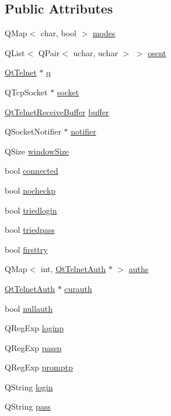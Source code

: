\subsection*{Public Attributes}
\begin{DoxyCompactItemize}
\item 
QMap$<$ char, bool $>$ \hyperlink{classQtTelnetPrivate_a19f4f4927ab411905a637e04694dd4b4}{modes}
\item 
QList$<$ QPair$<$ uchar, uchar $>$ $>$ \hyperlink{classQtTelnetPrivate_a8c36d306aa1d9e15183f339ec9bc5862}{osent}
\item 
\hyperlink{classQtTelnet}{QtTelnet} $\ast$ \hyperlink{classQtTelnetPrivate_accc5387fdb43bf070a18bcf975134406}{q}
\item 
QTcpSocket $\ast$ \hyperlink{classQtTelnetPrivate_a8a3800a6c6c14c4501ac0cb5d1f9996b}{socket}
\item 
\hyperlink{classQtTelnetReceiveBuffer}{QtTelnetReceiveBuffer} \hyperlink{classQtTelnetPrivate_a075248a1b2a42ca268848d2d5e89040b}{buffer}
\item 
QSocketNotifier $\ast$ \hyperlink{classQtTelnetPrivate_aacc76c154d962e6275960e4c48e503c9}{notifier}
\item 
QSize \hyperlink{classQtTelnetPrivate_af249e77e92cc059087ea90f48afe7f08}{windowSize}
\item 
bool \hyperlink{classQtTelnetPrivate_a974f5ee35e078ae2b13b3ad60bbb40cc}{connected}
\item 
bool \hyperlink{classQtTelnetPrivate_a2b680b042ddaada4aeb87b549669d979}{nocheckp}
\item 
bool \hyperlink{classQtTelnetPrivate_acc2df3045ddf17a821c8fd1d5e93e006}{triedlogin}
\item 
bool \hyperlink{classQtTelnetPrivate_a9314dd43d6817a310381d8867e9ed56f}{triedpass}
\item 
bool \hyperlink{classQtTelnetPrivate_a5c08132513e77454325480668f3ced49}{firsttry}
\item 
QMap$<$ int, \hyperlink{classQtTelnetAuth}{QtTelnetAuth} $\ast$ $>$ \hyperlink{classQtTelnetPrivate_af739b55b1e603436bda658ef8c94447d}{auths}
\item 
\hyperlink{classQtTelnetAuth}{QtTelnetAuth} $\ast$ \hyperlink{classQtTelnetPrivate_a5ba83994ceb1886f9aa8751edc289c2e}{curauth}
\item 
bool \hyperlink{classQtTelnetPrivate_a0b40d5a76ef06d3a224ac4623883e4c5}{nullauth}
\item 
QRegExp \hyperlink{classQtTelnetPrivate_a9e259a89ff0c66c78f16f63ec52307f5}{loginp}
\item 
QRegExp \hyperlink{classQtTelnetPrivate_ab162800a573c3b01b264a76b5e311f4b}{passp}
\item 
QRegExp \hyperlink{classQtTelnetPrivate_a2f2b0fe1bdb6bb84d9f5db5f38af0062}{promptp}
\item 
QString \hyperlink{classQtTelnetPrivate_ae443a4bb75c5d2398e4810791902a4c3}{login}
\item 
QString \hyperlink{classQtTelnetPrivate_ae4bbc9a28524e8e55071fdd9587303bc}{pass}
\end{DoxyCompactItemize}


